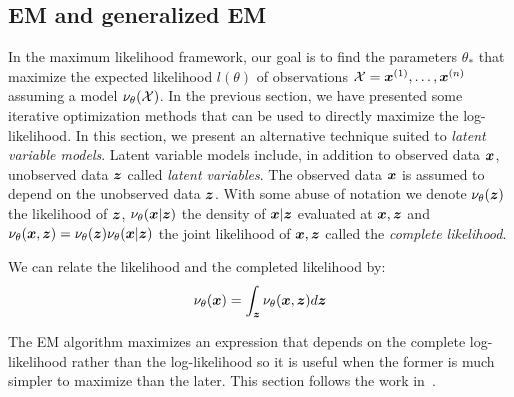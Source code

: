 \subsection{EM and generalized EM}
In the maximum likelihood framework, our goal is to find the parameters
$\theta_*$ that maximize the expected likelihood $l(\theta)$ of
observations $\mathcal{X} = \boldsymbol{x}^{(1)}, \dots, \boldsymbol{x}^{(n)}$ assuming a model
$\nu_{\theta}(\mathcal{X})$.
In the previous section, we have presented some iterative
optimization methods that can be used to directly maximize the log-likelihood.
In this section, we present an alternative technique suited to
\emph{latent variable models}.
Latent variable models include, in addition to observed data $\boldsymbol{x}$, unobserved data $\boldsymbol{z}$ called \emph{latent variables}. The observed data $\boldsymbol{x}$ is assumed to depend on the
unobserved data $\boldsymbol{z}$.
With some abuse of notation we denote $\nu_{\theta}(\boldsymbol{z})$
the likelihood of $\boldsymbol{z}$, $\nu_{\theta}(\boldsymbol{x} | \boldsymbol{z})$ the density of $\boldsymbol{x} | \boldsymbol{z}$
evaluated at $\boldsymbol{x}, \boldsymbol{z}$ and $\nu_{\theta}(\boldsymbol{x}, \boldsymbol{z}) =
\nu_{\theta}(\boldsymbol{z}) \nu_{\theta}(\boldsymbol{x} | \boldsymbol{z})$ the joint likelihood of $\boldsymbol{x}, \boldsymbol{z}$ called the
\emph{complete likelihood}.  

We can relate the likelihood and the completed likelihood by:
\begin{align}
  \nu_{\theta}(\boldsymbol{x}) = \int_{\boldsymbol{z}} \nu_{\theta}(\boldsymbol{x}, \boldsymbol{z}) d\boldsymbol{z}
\end{align}

The EM algorithm maximizes an expression
that depends on the complete log-likelihood rather than the log-likelihood so it
is useful when the former is much simpler to maximize than the later.
This section follows the work in~\cite{neal1998view}.

